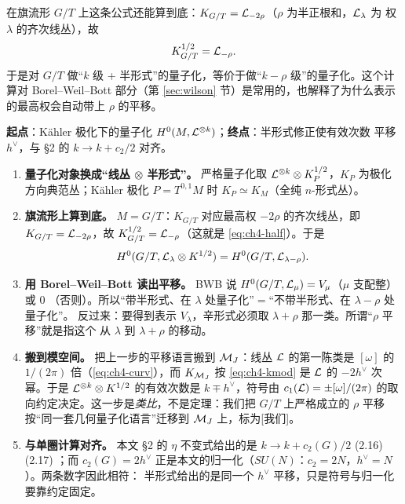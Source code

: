 在旗流形 $G/T$ 上这条公式还能算到底：$K_{G/T}=\mathcal{L}_{-2\rho}$（$\rho$ 为半正根和，$\mathcal{L}_\lambda$ 为
权 $\lambda$ 的齐次线丛），故
\begin{equation}
K_{G/T}^{1/2}=\mathcal{L}_{-\rho}.
\label{eq:ch4-half}
\end{equation}
于是对 $G/T$ 做“$k$ 级 + 半形式”的量子化，等价于做“$k-\rho$ 级”的量子化。这个计算对 Borel--Weil--Bott
部分（第 \ref{sec:wilson} 节）是常用的，也解释了为什么表示的最高权会自动带上 $\rho$ 的平移。

\begin{derivation}
\textbf{起点}：K\"ahler 极化下的量子化 $H^0(M,\mathcal{L}^{\otimes k})$；\textbf{终点}：半形式修正使有效次数
平移 $h^\vee$，与 §2 的 $k\to k+c_2/2$ 对齐。
\begin{enumerate}[label=\textbf{步 \arabic*.},leftmargin=2.8em]
\item \textbf{量子化对象换成“线丛 $\otimes$ 半形式”。} 严格量子化取
$\mathcal{L}^{\otimes k}\otimes K_P^{1/2}$，$K_P$ 为极化方向典范丛；K\"ahler 极化 $P=T^{0,1}M$ 时
$K_P\simeq K_M$（全纯 $n$-形式丛）。
\item \textbf{旗流形上算到底。} $M=G/T$：$K_{G/T}$ 对应最高权 $-2\rho$ 的齐次线丛，即
$K_{G/T}=\mathcal{L}_{-2\rho}$，故 $K_{G/T}^{1/2}=\mathcal{L}_{-\rho}$（这就是 \eqref{eq:ch4-half}）。于是
\begin{equation}
H^0(G/T,\mathcal{L}_\lambda\otimes K^{1/2})
=H^0(G/T,\mathcal{L}_{\lambda-\rho}).
\end{equation}
\item \textbf{用 Borel--Weil--Bott 读出平移。} BWB 说 $H^0(G/T,\mathcal{L}_\mu)=V_\mu$（$\mu$ 支配整）或 $0$
（否则）。所以“带半形式、在 $\lambda$ 处量子化”$=$“不带半形式、在 $\lambda-\rho$ 处量子化”。
反过来：要得到表示 $V_\lambda$，辛形式必须取 $\lambda+\rho$ 那一类。所谓“$\rho$ 平移”就是指这个
从 $\lambda$ 到 $\lambda+\rho$ 的移动。
\item \textbf{搬到模空间。} 把上一步的平移语言搬到 $\mathcal{M}_J$：线丛 $\mathcal{L}$ 的第一陈类是 $[\omega]$ 的
$1/(2\pi)$ 倍（\eqref{eq:ch4-curv}），而 $K_{\mathcal{M}_J}$ 按 \eqref{eq:ch4-kmod} 是 $\mathcal{L}$ 的
$-2h^\vee$ 次幂。于是 $\mathcal{L}^{\otimes k}\otimes K^{1/2}$ 的有效次数是 $k\mp h^\vee$，符号由
$c_1(\mathcal{L})=\pm[\omega]/(2\pi)$ 的取向约定决定。这一步是\emph{类比}，不是定理：我们把 $G/T$ 上严格成立的
$\rho$ 平移按“同一套几何量子化语言”迁移到 $\mathcal{M}_J$ 上，标为[我们]。
\item \textbf{与单圈计算对齐。} 本文 §2 的 $\eta$ 不变式给出的是 $k\to k+c_2(G)/2$ (2.16)(2.17)
；而 $c_2(G)=2h^\vee$ 正是本文的归一化（$SU(N)$：$c_2=2N$，$h^\vee=N$）。两条数字因此相符：
半形式给出的是同一个 $h^\vee$ 平移，只是符号与归一化要靠约定固定。
\end{enumerate}
\end{derivation}

